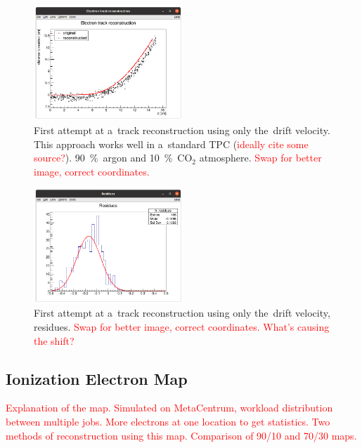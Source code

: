 \documentclass[]{article}
\begin{document}
			\begin{figure}
				\centering
				\includegraphics[width=0.5\textwidth]{9010_xz.png}
				\caption{First attempt at a~track reconstruction using only the~drift velocity. This approach works well in a~standard TPC (\textcolor{red}{ideally cite some source?}). 90~\%~argon and 10~\%~CO$_2$ atmosphere. \textcolor{red}{Swap for better image, correct coordinates.}}
				\label{fig:9010xz}
			\end{figure}
			
			\begin{figure}
				\centering
				\includegraphics[width=0.5\textwidth]{9010_res.png}
				\caption{First attempt at a~track reconstruction using only the~drift velocity, residues. \textcolor{red}{Swap for better image, correct coordinates. What's causing the shift?}}
				\label{fig:9010res}
			\end{figure}
			
		\subsection{Ionization Electron Map}
		\label{sec:map}
			\textcolor{red}{Explanation of the map. Simulated on MetaCentrum, workload distribution between multiple jobs. More electrons at one location to get statistics. Two methods of reconstruction using this map. Comparison of 90/10 and 70/30 maps.}
					
\end{document}
